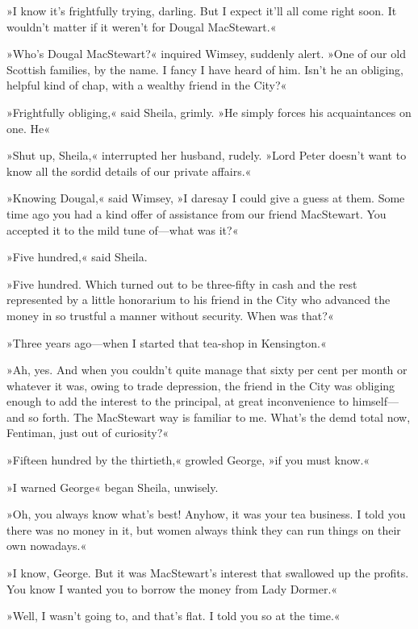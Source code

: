 »I know it's frightfully trying, darling. But I expect it'll all come right soon. It wouldn't matter if it weren't for Dougal MacStewart.«

»Who's Dougal MacStewart?« inquired Wimsey, suddenly alert. »One of our old Scottish families, by the name. I fancy I have heard of him. Isn't he an obliging, helpful kind of chap, with a wealthy friend in the City?«

»Frightfully obliging,« said Sheila, grimly. »He simply forces his acquaintances on one. He\longdash«

»Shut up, Sheila,« interrupted her husband, rudely. »Lord Peter doesn't want to know all the sordid details of our private affairs.«

»Knowing Dougal,« said Wimsey, »I daresay I could give a guess at them. Some time ago you had a kind offer of assistance from our friend MacStewart. You accepted it to the mild tune of\allowbreak---\allowbreak what was it?«

»Five hundred,« said Sheila.

»Five hundred. Which turned out to be three-fifty in cash and the rest represented by a little honorarium to his friend in the City who advanced the money in so trustful a manner without security. When was that?«

»Three years ago\allowbreak---\allowbreak when I started that tea-shop in Kensington.«

»Ah, yes. And when you couldn't quite manage that sixty per cent per month or whatever it was, owing to trade depression, the friend in the City was obliging enough to add the interest to the principal, at great inconvenience to himself\allowbreak---\allowbreak and so forth. The MacStewart way is familiar to me. What's the demd total now, Fentiman, just out of curiosity?«

»Fifteen hundred by the thirtieth,« growled George, »if you must know.«

»I warned George\longdash« began Sheila, unwisely.

»Oh, you always know what's best! Anyhow, it was your tea business. I told you there was no money in it, but women always think they can run things on their own nowadays.«

»I know, George. But it was MacStewart's interest that swallowed up the profits. You know I wanted you to borrow the money from Lady Dormer.«

»Well, I wasn't going to, and that's flat. I told you so at the time.«

